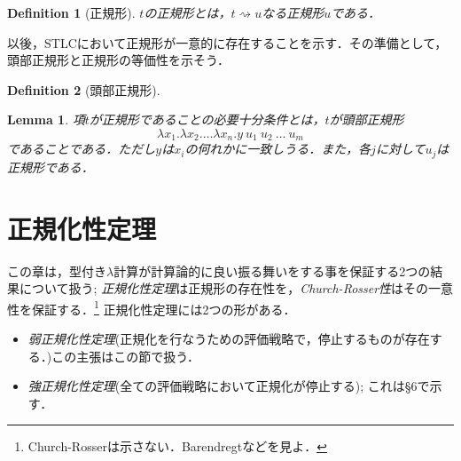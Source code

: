 \documentclass[a4paper,10pt,platex, dvipdfmx]{jsarticle}
\newtheorem{definition}{Definition}
\newtheorem{lemma}{Lemma}
\begin{document}
\begin{definition}[正規形]
    $t$の正規形とは，$t\rightsquigarrow u$なる正規形$u$である．
\end{definition}
以後，STLCにおいて正規形が一意的に存在することを示す．その準備として，頭部正規形と正規形の等価性を示そう．
\begin{definition}[頭部正規形]

\end{definition}
\begin{lemma}
項$t$が正規形であることの必要十分条件とは，$t$が\emph{頭部正規形}\begin{equation}
    \lambda x_{1}.\lambda x_{2}.\ldots \lambda x_{n}. y\ u_{1}\ u_{2}\ \ldots\ u_{m}
\end{equation}であることである．ただし$y$は$x_{i}$の何れかに一致しうる．また，各$j$に対して$u_{j}$は正規形である．
\end{lemma}
\section{正規化性定理}
この章は，型付き$\lambda$計算が計算論的に良い振る舞いをする事を保証する2つの結果について扱う; \emph{正規化性定理}は正規形の存在性を，\emph{Church-Rosser性}はその一意性を保証する．\footnote{Church-Rosserは示さない．Barendregtなどを見よ．}
正規化性定理には2つの形がある．\begin{itemize}
\item \emph{弱正規化性定理}(正規化を行なうための評価戦略で，停止するものが存在する．)この主張はこの節で扱う．
\item \emph{強正規化性定理}(全ての評価戦略において正規化が停止する); これは\S6で示す．
\end{itemize}
\end{document}

